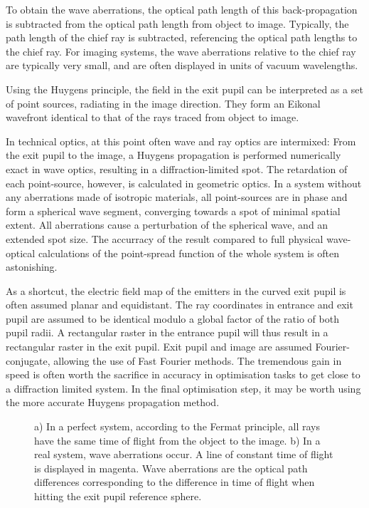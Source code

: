 \documentclass[12pt,a4paper,twoside,openright,BCOR10mm,headsepline,titlepage,abstracton,chapterprefix,final]{scrreprt}
\begin{document}
To obtain the wave aberrations, the optical path length of this back-propagation is subtracted from the optical path length from object to image.
Typically, the path length of the chief ray is subtracted, referencing the optical path lengths to the chief ray. 
For imaging systems, the wave aberrations relative to the chief ray are typically very small, and are often displayed in units of vacuum wavelengths.

Using the Huygens principle, the field in the exit pupil can be interpreted as a set of point sources, radiating in the image direction. 
They form an Eikonal wavefront identical to that of the rays traced from object to image.

In technical optics, at this point often wave and ray optics are intermixed:
From the exit pupil to the image, a Huygens propagation is performed numerically exact in wave optics, resulting in a diffraction-limited spot. 
The retardation of each point-source, however, is calculated in geometric optics.
In a system without any aberrations made of isotropic materials, all point-sources are in phase and form a spherical wave segment, converging towards a spot of minimal spatial extent.
All aberrations cause a perturbation of the spherical wave, and an extended spot size.
The accurracy of the result compared to full physical wave-optical calculations of the point-spread function of the whole system is often astonishing. 

As a shortcut, the electric field map of the emitters in the curved exit pupil is often assumed planar and equidistant. 
The ray coordinates in entrance and exit pupil are assumed to be identical modulo a global factor of the ratio of both pupil radii.
A rectangular raster in the entrance pupil will thus result in a rectangular raster in the exit pupil.
Exit pupil and image are assumed Fourier-conjugate, allowing the use of Fast Fourier methods.
The tremendous gain in speed is often worth the sacrifice in accuracy in optimisation tasks to get close to a diffraction limited system.
In the final optimisation step, it may be worth using the more accurate Huygens propagation method.

\begin{figure}
  \centering
  \caption{a) In a perfect system, according to the Fermat principle, all rays have the same time of flight from the object to the image. b) In a real system, wave aberrations occur. A line of constant time of flight is displayed in magenta.
  Wave aberrations are the optical path differences corresponding to the difference in time of flight when hitting the exit pupil reference sphere.}
  \label{fig:waveaberrations}
\end{figure}
\end{document}
